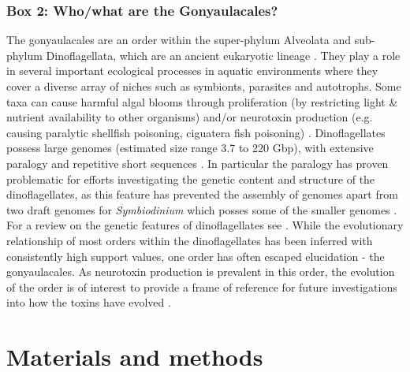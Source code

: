 \documentclass[12pt]{article}
\begin{document}
\subsubsection*{Box 2: Who/what are the Gonyaulacales?}
The gonyaulacales are an order within the super-phylum Alveolata and sub-phylum Dinoflagellata, which are an ancient eukaryotic lineage \cite{moldowan1998biogeochemical}. 
They play a role in several important ecological processes in aquatic environments where they cover a diverse array of niches such as symbionts, parasites and autotrophs. 
Some taxa can cause harmful algal blooms through proliferation (by restricting light \& nutrient availability to other organisms) and/or neurotoxin production (e.g. causing paralytic shellfish poisoning, ciguatera fish poisoning) \cite{murray2016unravelling}.
Dinoflagellates possess large genomes (estimated size range 3.7 to 220 Gbp), with extensive paralogy and repetitive short sequences  \cite{casabianca2017genome,murray2016unravelling}. 
In particular the paralogy has proven problematic for efforts investigating the genetic content and structure of the dinoflagellates, as this feature has prevented the assembly of genomes apart from two draft genomes for \textit{Symbiodinium} which posses some of the smaller genomes \cite{shoguchi2013draft,lin2015symbiodinium}. 
For a review on the genetic features of dinoflagellates see \cite{murray2016unravelling}. 
While the evolutionary relationship of most orders within the dinoflagellates has been inferred with consistently high support values, one order has often escaped elucidation - the gonyaulacales. 
As neurotoxin production is prevalent in this order, the evolution of the order is of interest to provide a frame of reference for future investigations into how the toxins have evolved \cite{shalchian2006combined,zhang2007three,saldarriaga2004molecular,hoppenrath2010dinoflagellate,murray2005improving}. 

\newpage
\section{Materials and methods}
\end{document}
